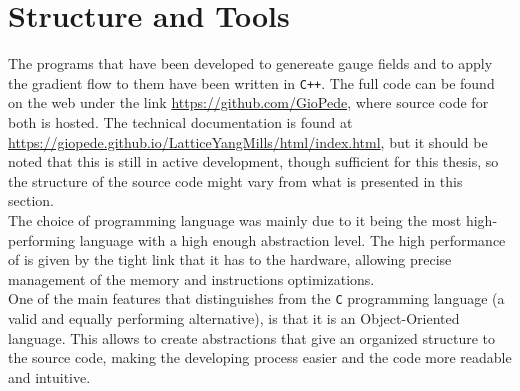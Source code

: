 \section{Structure and Tools}
The programs that have been developed to genereate gauge fields and to apply the gradient flow to them have been written in \texttt{C++}. The full code can be found on the web under the link \url{https://github.com/GioPede}, where source code for both is hosted. The technical documentation is found at \url{https://giopede.github.io/LatticeYangMills/html/index.html}, but it should be noted that this is still in active development, though sufficient for this thesis, so the structure of the source code might vary from what is presented in this section. \\
The choice of programming language was mainly due to it being the most high-performing language with a high enough abstraction level. The high performance of \cpp is given by the tight link that it has to the hardware, allowing precise management of the memory and instructions optimizations. \\
One of the main features that distinguishes \cpp from the \texttt{C} programming language (a valid and equally performing alternative), is that it is an Object-Oriented language. This allows to create abstractions that give an organized structure to the source code, making the developing process easier and the code more readable and intuitive.

